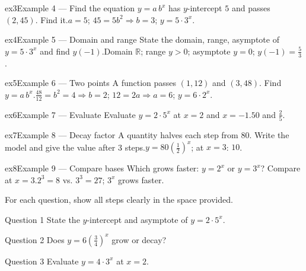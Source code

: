 \documentclass[11pt]{article}
\begin{document}
\begin{example}{ex3}{Example 4 --- Find the equation}
$y=a\,b^{x}$ has $y$-intercept $5$ and passes $(2,45)$. Find it.\soln $a=5$; $45=5b^2\Rightarrow b=3$; $y=5\cdot3^{x}$.
\end{example}

\begin{example}{ex4}{Example 5 --- Domain and range}
State the domain, range, asymptote of $y=5\cdot3^{x}$ and find $y(-1)$.\soln Domain $\mathbb{R}$; range $y>0$; asymptote $y=0$; $y(-1)=\tfrac53$.
\end{example}

\begin{example}{ex5}{Example 6 --- Two points}
A function passes $(1,12)$ and $(3,48)$. Find $y=a\,b^{x}$.\soln $\tfrac{48}{12}=b^2=4\Rightarrow b=2$; $12=2a\Rightarrow a=6$; $y=6\cdot2^{x}$.
\end{example}

\begin{example}{ex6}{Example 7 --- Evaluate}
Evaluate $y=2\cdot5^{x}$ at $x=2$ and $x=-1$.\soln $50$ and $\tfrac25$.
\end{example}

\begin{example}{ex7}{Example 8 --- Decay factor}
A quantity halves each step from $80$. Write the model and give the value after 3 steps.\soln $y=80\left(\tfrac12\right)^{x}$; at $x=3$: $10$.
\end{example}

\begin{example}{ex8}{Example 9 --- Compare bases}
Which grows faster: $y=2^{x}$ or $y=3^{x}$? Compare at $x=3$.\soln $2^3=8$ vs. $3^3=27$; $3^x$ grows faster.
\end{example}

\clearpage
{}
For each question, show all steps clearly in the space provided.

\begin{qbox}{Question 1}
State the $y$-intercept and asymptote of $y=2\cdot5^{x}$.\workspace{2.4cm}
\end{qbox}

\begin{qbox}{Question 2}
Does $y=6\left(\tfrac34\right)^{x}$ grow or decay?\workspace{2.4cm}
\end{qbox}

\begin{qbox}{Question 3}
Evaluate $y=4\cdot3^{x}$ at $x=2$.\workspace{2.4cm}
\end{qbox}
\end{document}
